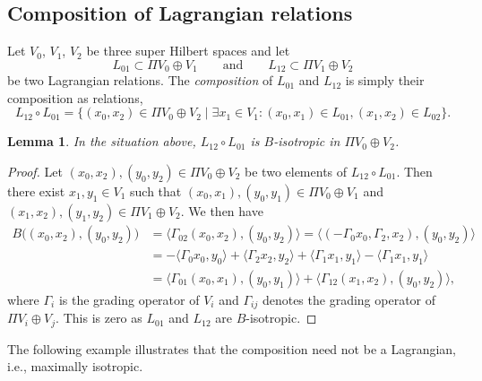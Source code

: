 \documentclass[10pt,a4paper]{amsart}
\numberwithin{equation}{section}
\newtheorem{Lemma}[Theorem]{Lemma}
\begin{document}
\subsection{Composition of Lagrangian relations}


\begin{Definition}
Let $V_0$, $V_1$, $V_2$ be three super Hilbert spaces
and let
\begin{equation*}
L_{01} \subset \Pi V_0 \oplus V_1 \qquad \text{and} \qquad L_{12} \subset \Pi V_1 \oplus V_2
\end{equation*}
 be two Lagrangian relations.
The \emph{composition} of $L_{01}$ and $L_{12}$ is simply their composition as relations,
\begin{equation*}
 L_{12} \circ L_{01} = \bigl\{ (x_0, x_2) \in \Pi V_0 \oplus V_2 \mid \exists x_1 \in V_1 \colon (x_0, x_1) \in L_{01}, (x_1, x_2) \in L_{02}\bigr\}.
\end{equation*}
\end{Definition}

\begin{Lemma} \label{LemmaCompositionIsotropic}
In the situation above, $L_{12} \circ L_{01}$ is $B$-isotropic in $\Pi V_0 \oplus V_2$.
\end{Lemma}

\begin{proof}
Let $(x_0, x_2), (y_0, y_2) \in \Pi V_0 \oplus V_2$ be two elements of $L_{12} \circ L_{01}$.
Then there exist $x_1, y_1 \in V_1$ such that $(x_0, x_1), (y_0, y_1) \in \Pi V_0 \oplus V_1$ and $(x_1, x_2), (y_1, y_2) \in \Pi V_1 \oplus V_2$.
We then have
\begin{align*}
B\bigl((x_0, x_2), (y_0, y_2)\bigr)
 &=\langle \Gamma_{02} (x_0, x_2), (y_0, y_2)\rangle = \bigl\langle (-\Gamma_0 x_0, \Gamma_2, x_2), (y_0, y_2) \bigr\rangle \\
 &= - \langle \Gamma_0 x_0, y_0\rangle + \langle \Gamma_2 x_2, y_2 \rangle + \langle \Gamma_1 x_1, y_1 \rangle - \langle \Gamma_1 x_1, y_1 \rangle\\
 &= \langle \Gamma_{01}(x_0, x_1), (y_0, y_1) \rangle + \langle \Gamma_{12} (x_1, x_2), (y_0, y_2) \rangle,
\end{align*}
where $\Gamma_i$ is the grading operator of $V_i$ and $\Gamma_{ij}$ denotes the grading operator of $\Pi V_i \oplus V_j$.
This is zero as $L_{01}$ and $L_{12}$ are $B$-isotropic.
\end{proof}

The following example illustrates that the composition need not be a Lagrangian, i.e., maximally isotropic.
\end{document}
